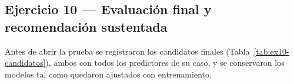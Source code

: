 \subsection{Ejercicio 10 --- Evaluación final y recomendación sustentada}

Antes de abrir la prueba se registraron los candidatos finales
(Tabla~\ref{tab:ex10-candidatos}), ambos con todos los predictores de su
caso, y se conservaron los modelos tal como quedaron ajustados con
entrenamiento.

\begin{table}[H]
\centering
\resizebox{\textwidth}{!}{}
\caption{Candidatos finales congelados, decididos con validación.}
\label{tab:ex10-candidatos}
\end{table}

